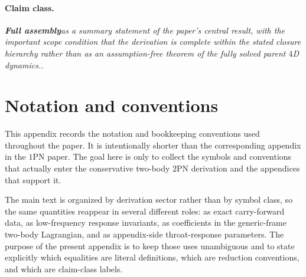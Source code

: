 \documentclass[11pt]{article}
\newcommand{\OnePN}{\mathrm{1PN}}
\newcommand{\TwoPN}{\mathrm{2PN}}
\newcommand{\FullMatch}{\textbf{Full assembly}}
\newcommand{\claimclass}[1]{\paragraph{Claim class.}\emph{#1.}}
\begin{document}
\claimclass{\FullMatch as a summary statement of the paper's central result, with the
important scope condition that the derivation is complete within the stated closure
hierarchy rather than as an assumption-free theorem of the fully solved parent \(4\)D
dynamics.}

\appendix

\section{Notation and conventions}
\label{app:notation}

This appendix records the notation and bookkeeping conventions used throughout the
paper.  It is intentionally shorter than the corresponding appendix in the
\(\OnePN\) paper.  The goal here is only to collect the symbols and conventions that
actually enter the conservative two-body \(\TwoPN\) derivation and the appendices that
support it.

The main text is organized by derivation sector rather than by symbol class, so the same
quantities reappear in several different roles: as exact carry-forward data, as
low-frequency response invariants, as coefficients in the generic-frame two-body
Lagrangian, and as appendix-side throat-response parameters.  The purpose of the present
appendix is to keep those uses unambiguous and to state explicitly which equalities are
literal definitions, which are reduction conventions, and which are claim-class labels.
\end{document}
